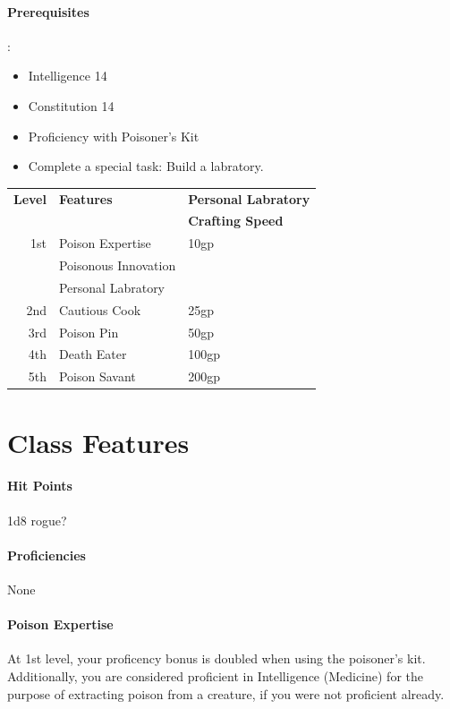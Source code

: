 \paragraph*{Prerequisites}:
\begin{itemize}
\item  Intelligence 14
\item  Constitution 14
\item  Proficiency with Poisoner's Kit
\item  Complete a special task: Build a labratory.
\end{itemize}
    


\begin{tabular}{rll}
{\bf Level} & {\bf Features} & {\bf Personal Labratory} \\&&{\bf Crafting Speed} \\
1st & Poison Expertise            & 10gp \\
    & Poisonous Innovation  &\\
    & Personal Labratory    &\\
2nd & Cautious Cook           & 25gp  \\
3rd & Poison Pin           & 50gp     \\
4th & Death Eater           & 100gp   \\
5th & Poison Savant           & 200gp \\
\end{tabular}

\section*{Class Features}

\paragraph*{Hit Points}
1d8 rogue?

\paragraph*{Proficiencies}
None


\paragraph*{Poison Expertise}
  At 1st level, your proficency bonus is doubled when using the poisoner's kit.
  Additionally, you are considered proficient in Intelligence (Medicine) for the purpose of extracting poison from a creature, if you were not proficient already.

